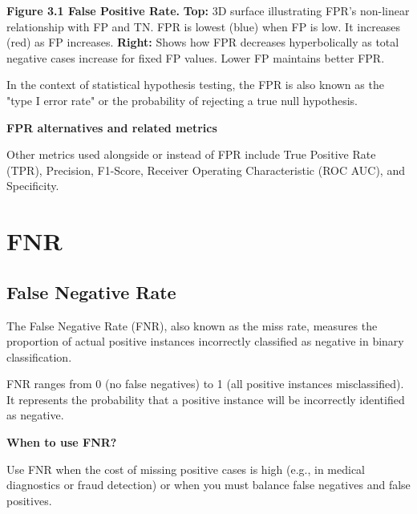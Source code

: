 \textbf{Figure 3.1 False Positive Rate.} 
\textbf{Top:}
3D surface illustrating FPR's non-linear relationship with FP and TN. FPR is lowest (blue) when FP is low. It increases (red) as FP increases.
\textbf{Right:}
Shows how FPR decreases hyperbolically as total negative cases increase for fixed FP values. Lower FP maintains better FPR.


{
In the context of statistical hypothesis testing, the FPR is also known as the "type I error rate" or the probability of rejecting a true null hypothesis.
}

\textbf{FPR alternatives and related metrics}

Other metrics used alongside or instead of FPR include True Positive Rate (TPR), Precision, F1-Score, Receiver Operating Characteristic (ROC AUC), and Specificity.


\clearpage
\section{FNR}
\subsection{False Negative Rate}
\thispagestyle{classificationstyle}

The False Negative Rate (FNR), also known as the miss rate, measures the proportion of actual positive instances incorrectly classified as negative in binary classification.
\begin{center}
\end{center}

FNR ranges from 0 (no false negatives) to 1 (all positive instances misclassified). It represents the probability that a positive instance will be incorrectly identified as negative.

\textbf{When to use FNR?}

Use FNR when the cost of missing positive cases is high (e.g., in medical diagnostics or fraud detection) or when you must balance false negatives and false positives.

